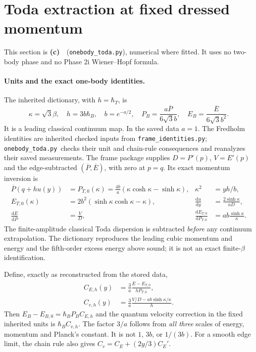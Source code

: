\documentclass[11pt,a4paper]{article}
\newcommand{\Lc}{\textbf{(c)}\ }
\newcommand{\dd}{\mathrm d}
\newcommand{\TT}{\texttt{onebody\_\allowbreak toda.py}}
\begin{document}
\section{Toda extraction at fixed dressed momentum}
This section is \Lc\ (\TT), numerical where fitted. It uses no two-body
phase and no Phase 2i Wiener--Hopf formula.

\paragraph{Units and the exact one-body identities.}
The inherited dictionary, with $h=\hbar_T$, is
\begin{equation}
 \kappa=\sqrt3\beta,\quad h=3b\hbar_B,\quad b=e^{-a/2},\quad
 P_B=\frac{a\overline P}{6\sqrt3 b},\quad
 E_B=\frac{\overline E}{6\sqrt3 b^2}. \label{eq:units}
\end{equation}
It is a leading classical continuum map. In the saved data $a=1$.
The Fredholm identities are inherited checked inputs from
\texttt{frame\_identities.py}; \TT\ checks their unit and chain-rule
consequences and reanalyzes their saved measurements.
The frame package supplies $D=P'(p)$, $V=E'(p)$ and
the edge-subtracted $(\overline P,\overline E)$, with zero at $p=q$.
Its exact momentum inversion is
\begin{align}
 \overline P(q+hu(y))&=P_{T,0}(\kappa)
     =\frac{4b}{a}(\kappa\cosh\kappa-\sinh\kappa),
 &\kappa^2&=yh/b,\\
 E_{T,0}(\kappa)&=2b^2(\sinh\kappa\cosh\kappa-\kappa),
 &\frac{\dd u}{\dd y}&=\frac{2\sinh\kappa}{aD},\\
 \frac{\dd\overline E}{\dd\overline P}&=\frac VD,
 &\frac{\dd E_{T,0}}{\dd P_{T,0}}&=ab\frac{\sinh\kappa}{\kappa}.
\end{align}
The finite-amplitude classical Toda dispersion is subtracted \emph{before}
any continuum extrapolation. The dictionary reproduces the leading cubic
momentum and energy and the fifth-order excess energy above sound;
it is not an exact finite-$\beta$ identification.

Define, exactly as reconstructed from the stored data,
\begin{align}
 C_{E,h}(y)&=\frac{3}{a}\frac{\overline E-E_{T,0}}{hP_{T,0}},\\
 C_{v,h}(y)&=\frac3a\frac{V/D-ab\sinh\kappa/\kappa}{h}.
 \label{eq:coeff}
\end{align}
Then $E_B-E_{B,0}=\hbar_B P_B C_{E,h}$ and the quantum velocity correction
in the fixed inherited units is $\hbar_B C_{v,h}$.
The factor $3/a$ follows from \emph{all three} scales of energy, momentum
and Planck's constant. It is not $1$, $3b$, or $1/(3b)$.
For a smooth edge limit, the chain rule also gives
$C_v=C_E+(2y/3)C_E'$.
\end{document}
